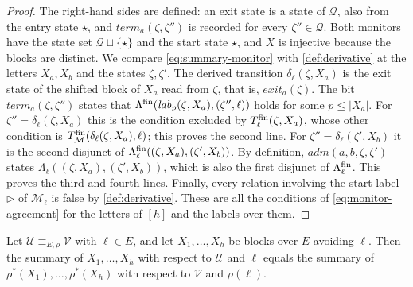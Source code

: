 \begin{proof}
The right-hand sides are defined: an exit state is a state of $\mathcal Q$,
also from the entry state $\star$, and $\mathit{term}_a(\zeta,\zeta'')$ is
recorded for every $\zeta''\in\mathcal Q$. Both monitors have the state set
$\mathcal Q\sqcup\{\star\}$ and the start state $\star$, and $X$ is
injective because the blocks are distinct. We compare
\eqref{eq:summary-monitor} with \cref{def:derivative} at the letters
$X_a,X_b$ and the states $\zeta,\zeta'$. The derived transition
$\delta_\ell(\zeta,X_a)$ is the exit state of the shifted block of $X_a$ read
from $\zeta$, that is, $\mathit{exit}_a(\zeta)$. The bit
$\mathit{term}_a(\zeta,\zeta'')$ states that
$\Lambda^{\mathrm{fin}}(\mathit{lab}_p(\zeta,X_a),(\zeta'',\ell))$ holds for some
$p\le|X_a|$. For $\zeta''=\delta_\ell(\zeta,X_a)$ this is the condition
excluded by $T^{\mathrm{fin}}_\ell(\zeta,X_a)$, whose other condition is
$T^{\mathrm{fin}}_{\mathcal M}(\delta_\ell(\zeta,X_a),\ell)$; this proves the second
line. For $\zeta''=\delta_\ell(\zeta',X_b)$ it is the second disjunct of
$\Lambda^{\mathrm{fin}}_\ell((\zeta,X_a),(\zeta',X_b))$. By definition,
$\mathit{adm}(a,b,\zeta,\zeta')$ states
$\Lambda_\ell((\zeta,X_a),(\zeta',X_b))$, which is also the first disjunct
of $\Lambda^{\mathrm{fin}}_\ell$. This proves the third and fourth lines. Finally, every
relation involving the start label $\triangleright$ of $\mathcal M_\ell$ is
false by \cref{def:derivative}. These are all the conditions of
\eqref{eq:monitor-agreement} for the letters of $[h]$ and the labels over
them.
\end{proof}

\begin{lemma}\label{lem:summary-agreement}
Let $\mathcal U\equiv_{E,\rho}\mathcal V$ with $\ell\in E$, and let
$X_1,\ldots,X_h$ be blocks over $E$ avoiding $\ell$. Then the summary of
$X_1,\ldots,X_h$ with respect to $\mathcal U$ and $\ell$ equals the summary
of $\rho^*(X_1),\ldots,\rho^*(X_h)$ with respect to $\mathcal V$ and
$\rho(\ell)$.
\end{lemma}

